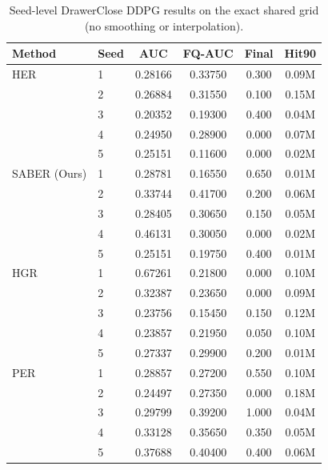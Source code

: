 \begin{table}[t]
\centering
\small
\setlength{\tabcolsep}{1pt}
\begin{tabular}{llcccc}
\toprule
Method & Seed & AUC & FQ-AUC & Final & Hit90 \\
\midrule
HER & 1 & 0.28166 & 0.33750 & 0.300 & 0.09M \\
 & 2 & 0.26884 & 0.31550 & 0.100 & 0.15M \\
 & 3 & 0.20352 & 0.19300 & 0.400 & 0.04M \\
 & 4 & 0.24950 & 0.28900 & 0.000 & 0.07M \\
 & 5 & 0.25151 & 0.11600 & 0.000 & 0.02M \\
\addlinespace[1pt]
SABER (Ours) & 1 & 0.28781 & 0.16550 & 0.650 & 0.01M \\
 & 2 & 0.33744 & 0.41700 & 0.200 & 0.06M \\
 & 3 & 0.28405 & 0.30650 & 0.150 & 0.05M \\
 & 4 & 0.46131 & 0.30050 & 0.000 & 0.02M \\
 & 5 & 0.25151 & 0.19750 & 0.400 & 0.01M \\
\addlinespace[1pt]
HGR & 1 & 0.67261 & 0.21800 & 0.000 & 0.10M \\
 & 2 & 0.32387 & 0.23650 & 0.000 & 0.09M \\
 & 3 & 0.23756 & 0.15450 & 0.150 & 0.12M \\
 & 4 & 0.23857 & 0.21950 & 0.050 & 0.10M \\
 & 5 & 0.27337 & 0.29900 & 0.200 & 0.01M \\
\addlinespace[1pt]
PER & 1 & 0.28857 & 0.27200 & 0.550 & 0.10M \\
 & 2 & 0.24497 & 0.27350 & 0.000 & 0.18M \\
 & 3 & 0.29799 & 0.39200 & 1.000 & 0.04M \\
 & 4 & 0.33128 & 0.35650 & 0.350 & 0.05M \\
 & 5 & 0.37688 & 0.40400 & 0.400 & 0.06M \\
\bottomrule
\end{tabular}
\caption{Seed-level DrawerClose DDPG results on the exact shared grid (no smoothing or interpolation).}
\label{tab:supp-seeds-drawer-close-ddpg}
\end{table}
